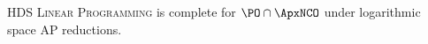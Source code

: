 \begin{conjecture}
  \textsc{HDS Linear Programming} is complete for $\PO \cap \ApxNCO$ under logarithmic space AP reductions.
\end{conjecture}








